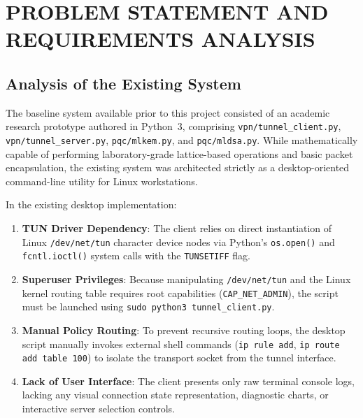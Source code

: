 
\chapter{PROBLEM STATEMENT AND REQUIREMENTS ANALYSIS}
\label{chap:requirements}

\section{Analysis of the Existing System}
\label{sec:existing_system_analysis}

The baseline system available prior to this project consisted of an academic research prototype authored in Python~3, comprising \texttt{vpn/tunnel\_client.py}, \texttt{vpn/tunnel\_server.py}, \texttt{pqc/mlkem.py}, and \texttt{pqc/mldsa.py}. While mathematically capable of performing laboratory-grade lattice-based operations and basic packet encapsulation, the existing system was architected strictly as a desktop-oriented command-line utility for Linux workstations.

In the existing desktop implementation:
\begin{enumerate}
    \item \textbf{TUN Driver Dependency}: The client relies on direct instantiation of Linux \texttt{/dev/net/tun} character device nodes via Python's \texttt{os.open()} and \texttt{fcntl.ioctl()} system calls with the \texttt{TUNSETIFF} flag.
    \item \textbf{Superuser Privileges}: Because manipulating \texttt{/dev/net/tun} and the Linux kernel routing table requires root capabilities (\texttt{CAP\_NET\_ADMIN}), the script must be launched using \texttt{sudo python3 tunnel\_client.py}.
    \item \textbf{Manual Policy Routing}: To prevent recursive routing loops, the desktop script manually invokes external shell commands (\texttt{ip rule add}, \texttt{ip route add table 100}) to isolate the transport socket from the tunnel interface.
    \item \textbf{Lack of User Interface}: The client presents only raw terminal console logs, lacking any visual connection state representation, diagnostic charts, or interactive server selection controls.
\end{enumerate}

